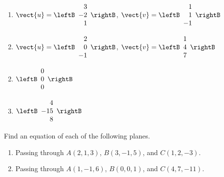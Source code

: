 \begin{multicols}{2}
\begin{ex}
\begin{enumerate}[label={\alph*.}]
\item $\vect{u} = \leftB
\begin{array}{r}
3\\
-2\\
1
\end{array}
\rightB$, 
$\vect{v} = \leftB
\begin{array}{r}
1\\
1\\
-1
\end{array}
\rightB
$

\item $\vect{u} = \leftB
\begin{array}{r}
2\\
0\\
-1
\end{array}
\rightB$, 
$\vect{v} = \leftB
\begin{array}{r}
1\\
4\\
7
\end{array}
\rightB
$

\end{enumerate}
\begin{sol}
\begin{enumerate}[label={\alph*.}]
\setcounter{enumi}{1}
\item  
$\leftB
\begin{array}{r}
0\\
0\\
0
\end{array}
\rightB
$


\setcounter{enumi}{1}
\item 
$\leftB
\begin{array}{r}
4\\
-15\\
8
\end{array}
\rightB
$

\end{enumerate}
\end{sol}
\end{ex}

\begin{ex}
Find an equation of each of the following planes.


\begin{enumerate}[label={\alph*.}]
\item Passing through $A(2, 1, 3)$, $B(3, -1, 5)$, and $C(1, 2, -3)$.

\item Passing through $A(1, -1, 6)$, $B(0, 0, 1)$, and $C(4, 7, -11)$.


\end{enumerate}
\end{ex}
\end{multicols}
